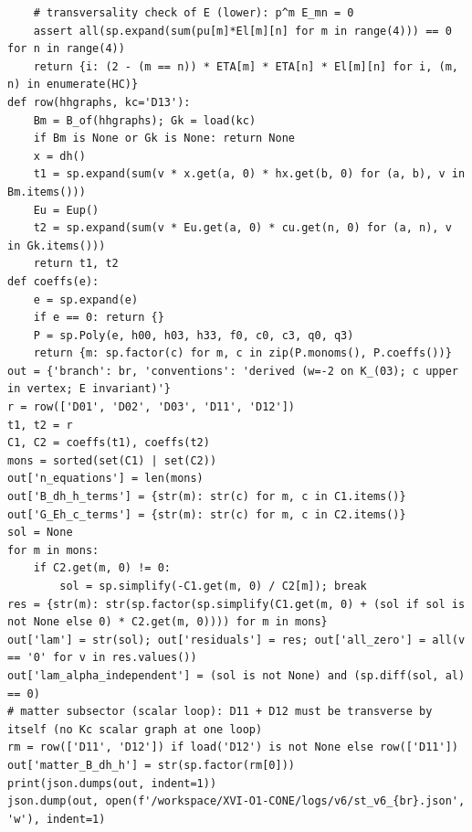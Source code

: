 \documentclass[10pt]{article}
\begin{document}
\begin{lstlisting}
    # transversality check of E (lower): p^m E_mn = 0
    assert all(sp.expand(sum(pu[m]*El[m][n] for m in range(4))) == 0 for n in range(4))
    return {i: (2 - (m == n)) * ETA[m] * ETA[n] * El[m][n] for i, (m, n) in enumerate(HC)}
def row(hhgraphs, kc='D13'):
    Bm = B_of(hhgraphs); Gk = load(kc)
    if Bm is None or Gk is None: return None
    x = dh()
    t1 = sp.expand(sum(v * x.get(a, 0) * hx.get(b, 0) for (a, b), v in Bm.items()))
    Eu = Eup()
    t2 = sp.expand(sum(v * Eu.get(a, 0) * cu.get(n, 0) for (a, n), v in Gk.items()))
    return t1, t2
def coeffs(e):
    e = sp.expand(e)
    if e == 0: return {}
    P = sp.Poly(e, h00, h03, h33, f0, c0, c3, q0, q3)
    return {m: sp.factor(c) for m, c in zip(P.monoms(), P.coeffs())}
out = {'branch': br, 'conventions': 'derived (w=-2 on K_(03); c upper in vertex; E invariant)'}
r = row(['D01', 'D02', 'D03', 'D11', 'D12'])
t1, t2 = r
C1, C2 = coeffs(t1), coeffs(t2)
mons = sorted(set(C1) | set(C2))
out['n_equations'] = len(mons)
out['B_dh_h_terms'] = {str(m): str(c) for m, c in C1.items()}
out['G_Eh_c_terms'] = {str(m): str(c) for m, c in C2.items()}
sol = None
for m in mons:
    if C2.get(m, 0) != 0:
        sol = sp.simplify(-C1.get(m, 0) / C2[m]); break
res = {str(m): str(sp.factor(sp.simplify(C1.get(m, 0) + (sol if sol is not None else 0) * C2.get(m, 0)))) for m in mons}
out['lam'] = str(sol); out['residuals'] = res; out['all_zero'] = all(v == '0' for v in res.values())
out['lam_alpha_independent'] = (sol is not None) and (sp.diff(sol, al) == 0)
# matter subsector (scalar loop): D11 + D12 must be transverse by itself (no Kc scalar graph at one loop)
rm = row(['D11', 'D12']) if load('D12') is not None else row(['D11'])
out['matter_B_dh_h'] = str(sp.factor(rm[0]))
print(json.dumps(out, indent=1))
json.dump(out, open(f'/workspace/XVI-O1-CONE/logs/v6/st_v6_{br}.json', 'w'), indent=1)
\end{lstlisting}
\end{document}
